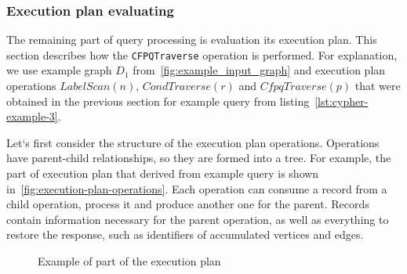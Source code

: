 \subsubsection{Execution plan evaluating}
\label{subsubsec:execution-plan-evaluating}

The remaining part of query processing is evaluation its execution plan. This section describes how the \lstinline{CFPQTraverse} operation is performed. For explanation, we use example graph $D_1$ from~\autoref{fig:example_input_graph} and execution plan operations $LabelScan(n)$, $CondTraverse(r)$ and $CfpqTraverse(p)$ that were obtained in the previous section for example query from listing~\autoref{lst:cypher-example-3}.

Let`s first consider the structure of the execution plan operations. Operations have parent-child relationships, so they are formed into a tree. For example, the part of execution plan that derived from example query is shown in~\autoref{fig:execution-plan-operations}. Each operation can consume a record from a child operation, process it and produce another one for the parent. Records contain information necessary for the parent operation, as well as everything to restore the response, such as identifiers of accumulated vertices and edges.

\begin{figure}[h]
    \centering        
    \caption{Example of part of the execution plan}
    \label{fig:execution-plan-operations}
\end{figure}


